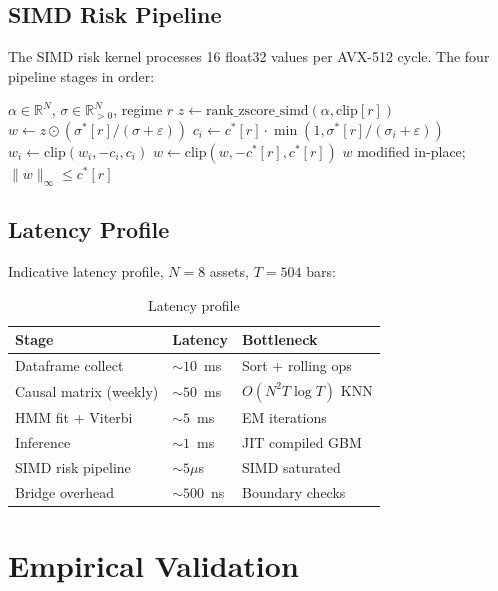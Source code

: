 \documentclass[11pt]{article}
\begin{document}
\subsection{SIMD Risk Pipeline}

The SIMD risk kernel processes 16 float32 values per AVX-512 cycle. The four pipeline stages in order:

\begin{algorithm}[H]
\caption{SIMD Risk Pipeline}
\begin{algorithmic}[1]
\Require $\alpha \in \mathbb{R}^N$, $\sigma \in \mathbb{R}^N_{>0}$, regime $r$
\State $z \gets \text{rank\_zscore\_simd}(\alpha, \text{clip}[r])$
\State $w \gets z \odot (\sigma^*[r] / (\sigma + \varepsilon))$
    \State $c_i \gets c^*[r] \cdot \min(1, \sigma^*[r]/(\sigma_i + \varepsilon))$
    \State $w_i \gets \text{clip}(w_i, -c_i, c_i)$
\EndFor
\State $w \gets \text{clip}(w, -c^*[r], c^*[r])$ 
\Ensure $w$ modified in-place; $\|w\|_\infty \leq c^*[r]$
\end{algorithmic}
\end{algorithm}

\subsection{Latency Profile}

Indicative latency profile, $N = 8$ assets, $T = 504$ bars:

\begin{table}[h]
\centering
\caption{Latency profile}
\begin{tabular}{lll}
\toprule
Stage & Latency & Bottleneck \\
\midrule
Dataframe collect & $\sim 10$~ms & Sort + rolling ops \\
Causal matrix (weekly) & $\sim 50$~ms & $O(N^2 T \log T)$ KNN \\
HMM fit + Viterbi & $\sim 5$~ms & EM iterations \\
Inference & $\sim 1$~ms & JIT compiled GBM \\
SIMD risk pipeline & $\sim 5\mu$s & SIMD saturated \\
Bridge overhead & $\sim 500$~ns & Boundary checks \\
\bottomrule
\end{tabular}
\end{table}

\section{Empirical Validation}
\end{document}
